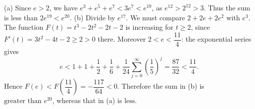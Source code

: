 (a) Since $e>2$, we have $e^3+e^5+e^7<3e^7<e^{19}$, as $e^{12}>2^{12}>3$. Thus the sum is less than $2e^{19}<e^{20}$.
(b) Divide by $e^{17}$. We must compare $2+2e+2e^2$ with $e^3$. The function $F(t)=t^3-2t^2-2t-2$ is increasing for $t\ge2$, since $F'(t)=3t^2-4t-2\ge2>0$ there. Moreover $2<e<\dfrac{11}{4}$: the exponential series gives
\[e<1+1+\dfrac{1}{2}+\dfrac{1}{6}+\dfrac{1}{24}\sum_{j=0}^\infty\left(\dfrac{1}{5}\right)^j=\dfrac{87}{32}<\dfrac{11}{4}.\]
Hence $F(e)<F(\dfrac{11}{4})=-\dfrac{117}{64}<0$. Therefore the sum in (b) is $\boxed{\text{greater than }e^{20}}$, whereas that in (a) is $\boxed{\text{less}}$.
